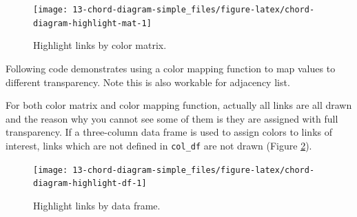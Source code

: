 \documentclass[]{book}
\newenvironment{Shaded}{\begin{snugshade}}{\end{snugshade}}
\newcommand{\KeywordTok}[1]{\textcolor[rgb]{0.13,0.29,0.53}{\textbf{#1}}}
\newcommand{\DataTypeTok}[1]{\textcolor[rgb]{0.13,0.29,0.53}{#1}}
\newcommand{\DecValTok}[1]{\textcolor[rgb]{0.00,0.00,0.81}{#1}}
\newcommand{\StringTok}[1]{\textcolor[rgb]{0.31,0.60,0.02}{#1}}
\newcommand{\ControlFlowTok}[1]{\textcolor[rgb]{0.13,0.29,0.53}{\textbf{#1}}}
\newcommand{\OperatorTok}[1]{\textcolor[rgb]{0.81,0.36,0.00}{\textbf{#1}}}
\newcommand{\NormalTok}[1]{#1}
\begin{document}
\begin{figure}

{\centering \texttt{[image: 13-chord-diagram-simple\_files/figure-latex/chord-diagram-highlight-mat-1]} 

}

\caption{Highlight links by color matrix.}\label{fig:chord-diagram-highlight-mat}
\end{figure}

Following code demonstrates using a color mapping function to map values
to different transparency. Note this is also workable for adjacency
list.

\begin{Shaded}
\end{Shaded}

For both color matrix and color mapping function, actually all links are
all drawn and the reason why you cannot see some of them is they are
assigned with full transparency. If a three-column data frame is used to
assign colors to links of interest, links which are not defined in
\texttt{col\_df} are not drawn (Figure
\ref{fig:chord-diagram-highlight-df}).

\begin{Shaded}
\end{Shaded}

\begin{figure}

{\centering \texttt{[image: 13-chord-diagram-simple\_files/figure-latex/chord-diagram-highlight-df-1]} 

}

\caption{Highlight links by data frame.}\label{fig:chord-diagram-highlight-df}
\end{figure}
\end{document}
